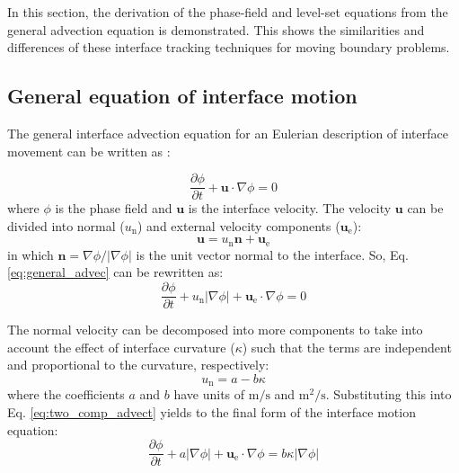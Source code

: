 In this section, the derivation of the phase-field and level-set equations from the general advection equation is demonstrated. This shows the similarities and differences of these interface tracking techniques for moving boundary problems.

\subsection{General equation of interface motion}

The general interface advection equation for an Eulerian description of interface movement can be written as \cite{Sun2007}:

\begin{equation} \label{eq:general_advec}
\frac{\partial \phi}{\partial t}+\boldsymbol{u} \cdot \nabla \phi=0
\end{equation}
where $\phi$ is the phase field and $\boldsymbol{u}$ is the interface velocity. The velocity $\boldsymbol{u}$ can be divided into normal ($u_{\mathrm{n}}$) and external velocity components ($\boldsymbol{u}_{\mathrm{e}}$):
\begin{equation} \label{eq:two_comp_advect}
\boldsymbol{u}=u_{\mathrm{n}} \boldsymbol{n}+\boldsymbol{u}_{\mathrm{e}}
\end{equation}
in which $\boldsymbol{n}=\nabla \phi /|\nabla \phi|$ is the unit vector normal to the interface. So, Eq. \ref{eq:general_advec} can be rewritten as:
\begin{equation}
\frac{\partial \phi}{\partial t}+u_{\mathrm{n}}|\nabla \phi|+\boldsymbol{u}_{\mathrm{e}} \cdot \nabla \phi=0
\end{equation}

The normal velocity can be decomposed into more components to take into account the effect of interface curvature ($\kappa$) such that the terms are independent and proportional to the curvature, respectively:
\begin{equation}
u_{\mathrm{n}} = a - b \kappa
\end{equation}
where the coefficients $a$ and $b$ have units of $\mathrm{m}/\mathrm{s}$ and $\mathrm{m}^2/\mathrm{s}$. Substituting this into Eq. \ref{eq:two_comp_advect}  yields to the final form of the interface motion equation:
\begin{equation} \label{eq:advect_kappa}
\frac{\partial \phi}{\partial t}+a|\nabla \phi|+\boldsymbol{u}_{\mathrm{e}} \cdot \nabla \phi=b \kappa|\nabla \phi|
\end{equation}


